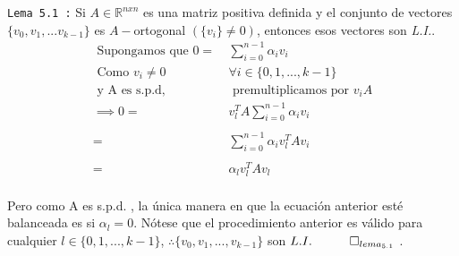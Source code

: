 \documentclass[12pt]{article}
\newcommand{\beas}{\begin{eqnarray*}}
\newcommand{\eeas}{\end{eqnarray*}}
\begin{document}
\begin{enumerate}
 {\tt Lema 5.1 :} Si $ A \in \mathbb{R}^{nxn}$ es una matriz positiva definida y el conjunto de vectores $\{v_0,v_1,...v_{k-1}\}$ es $A-$ortogonal $(\{v_i\} \ne 0)$, entonces esos vectores son {\it L.I.}.
 \beas
 \text{ Supongamos que } 0 = \ &\sum_{i = 0}^{n-1} \alpha_i v_i \\
 \text{ Como  } v_i \ne 0 \quad &\forall i \in \{0 ,1, ... ,k-1\} \\
 \text{ y A es s.p.d, } \ \ \ &\text{ premultiplicamos por } v_iA \\
 \implies 0 =\ &v_l^TA \sum_{i = 0}^{n-1} \alpha_i v_i \\ \\ 
			=\ &\sum_{i = 0}^{n-1} \alpha_i  v_l^TAv_i \\ \\
			=\ &\alpha_l v_l^TAv_l 
 \eeas
 \\
 \noindent Pero como A es s.p.d. , la \'unica manera en que la ecuaci\'on anterior est\'e balanceada es si $\alpha_l = 0$. N\'otese que el procedimiento anterior es v\'alido para cualquier $l \in \{0, 1, ..., k-1\}$, $\therefore \{v_0, v_1, ..., v_{k-1}\}$ son $L.I. \quad \qed_{lema_{5.1}}$ . \\


\end{enumerate}
\end{document}
